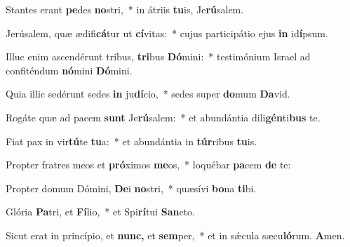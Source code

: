 \item Stantes erant \textbf{pe}des \textbf{no}stri,~* in átriis \textbf{tu}is, Je\textbf{rú}salem.
\item Jerúsalem, quæ ædifi\textbf{cá}tur ut \textbf{cí}vitas:~* cujus participátio ejus \textbf{in} id\textbf{í}psum.
\item Illuc enim ascendérunt tribus, \textbf{tri}bus \textbf{Dó}mini:~* testimónium Israel ad confiténdum \textbf{nó}mini \textbf{Dó}mini.
\item Quia illic sedérunt sedes \textbf{in} ju\textbf{dí}cio,~* sedes super \textbf{do}mum \textbf{Da}vid.
\item Rogáte quæ ad pacem \textbf{sunt} Je\textbf{rú}salem:~* et abundántia dili\textbf{gén}ti\textbf{bus} te.
\item Fiat pax in vir\textbf{tú}te \textbf{tu}a:~* et abundántia in \textbf{túr}ribus \textbf{tu}is.
\item Propter fratres meos et \textbf{pró}ximos \textbf{me}os,~* loquébar \textbf{pa}cem \textbf{de} te:
\item Propter domum Dómini, \textbf{De}i \textbf{no}stri,~* quæsívi \textbf{bo}na \textbf{ti}bi.
\item Glória \textbf{Pa}tri, et \textbf{Fí}lio,~* et Spi\textbf{rí}tui \textbf{San}cto.
\item Sicut erat in princípio, et \textbf{nunc,} et \textbf{sem}per,~* et in sǽcula sæcu\textbf{ló}rum. \textbf{A}men.
